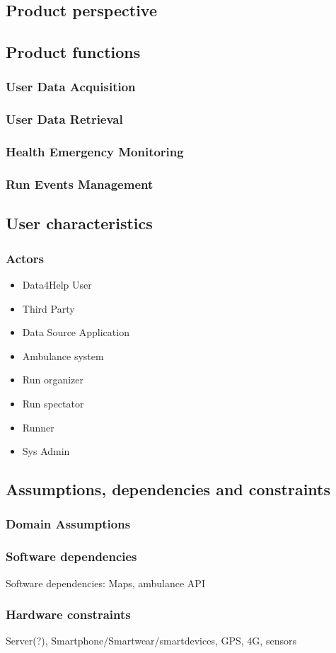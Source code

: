 \subsection{Product perspective}

\subsection{Product functions}

\subsubsection{User Data Acquisition}
\subsubsection{User Data Retrieval}
\subsubsection{Health Emergency Monitoring}
\subsubsection{Run Events Management}

\subsection{User characteristics}
\subsubsection{Actors}
\begin{itemize}
\item Data4Help User
\item Third Party
\item Data Source Application
\item Ambulance system
\item Run organizer
\item Run spectator
\item Runner
\item Sys Admin
\end{itemize}
\subsection{Assumptions, dependencies and constraints}
\subsubsection{Domain Assumptions}
\subsubsection{Software dependencies}
Software dependencies: Maps, ambulance API
\subsubsection{Hardware constraints}
Server(?), Smartphone/Smartwear/smartdevices, GPS, 4G, sensors